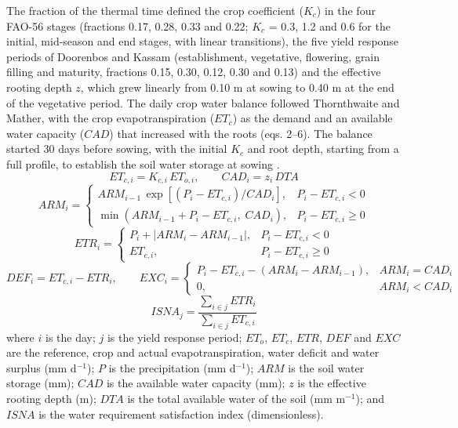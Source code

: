 \documentclass[10pt,a4paper]{article}
\begin{document}
The fraction of the thermal time defined the crop coefficient ($K_c$) in the four FAO-56 stages
(fractions 0.17, 0.28, 0.33 and 0.22; $K_c$ = 0.3, 1.2 and 0.6 for the initial, mid-season and end
stages, with linear transitions), the five yield response periods of Doorenbos and Kassam
(establishment, vegetative, flowering, grain filling and maturity, fractions 0.15, 0.30, 0.12, 0.30 and
0.13) and the effective rooting depth $z$, which grew linearly from 0.10 m at sowing to 0.40 m at the end
of the vegetative period. The daily crop water balance followed Thornthwaite and Mather, with the crop
evapotranspiration ($ET_c$) as the demand and an available water capacity ($CAD$) that increased with
the roots (eqs. 2--6). The balance started 30 days before sowing, with the initial $K_c$ and root depth,
starting from a full profile, to establish the soil water storage at sowing \citep{allen1998,
doorenbos1979, thornthwaite1955}.
\begin{equation}
ET_{c,i} = K_{c,i}\, ET_{o,i}, \qquad CAD_i = z_i\, DTA
\label{eq:etc}
\end{equation}
\begin{equation}
ARM_i =
\begin{cases}
ARM_{i-1}\,\exp\!\left[(P_i - ET_{c,i})/CAD_i\right], & P_i - ET_{c,i} < 0\\[2pt]
\min\!\left(ARM_{i-1} + P_i - ET_{c,i},\; CAD_i\right), & P_i - ET_{c,i} \ge 0
\end{cases}
\label{eq:arm}
\end{equation}
\begin{equation}
ETR_i =
\begin{cases}
P_i + \lvert ARM_i - ARM_{i-1} \rvert, & P_i - ET_{c,i} < 0\\
ET_{c,i}, & P_i - ET_{c,i} \ge 0
\end{cases}
\label{eq:etr}
\end{equation}
\begin{equation}
DEF_i = ET_{c,i} - ETR_i, \qquad
EXC_i =
\begin{cases}
P_i - ET_{c,i} - (ARM_i - ARM_{i-1}), & ARM_i = CAD_i\\
0, & ARM_i < CAD_i
\end{cases}
\label{eq:def}
\end{equation}
\begin{equation}
ISNA_j = \frac{\sum_{i \in j} ETR_i}{\sum_{i \in j} ET_{c,i}}
\label{eq:isna}
\end{equation}
where $i$ is the day; $j$ is the yield response period; $ET_o$, $ET_c$, $ETR$, $DEF$ and $EXC$ are the
reference, crop and actual evapotranspiration, water deficit and water surplus (mm d$^{-1}$); $P$ is the
precipitation (mm d$^{-1}$); $ARM$ is the soil water storage (mm); $CAD$ is the available water capacity
(mm); $z$ is the effective rooting depth (m); $DTA$ is the total available water of the soil
(mm m$^{-1}$); and $ISNA$ is the water requirement satisfaction index (dimensionless).
\end{document}
